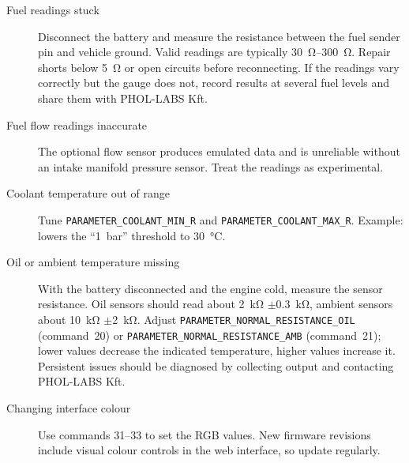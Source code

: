 \begin{description}
    \item[Fuel readings stuck] Disconnect the battery and measure the resistance between the fuel sender pin and vehicle ground. Valid readings are typically \SIrange{30}{300}{\ohm}. Repair shorts below \SI{5}{\ohm} or open circuits before reconnecting. If the readings vary correctly but the gauge does not, record  results at several fuel levels and share them with PHOL-LABS Kft.
    \item[Fuel flow readings inaccurate] The optional flow sensor produces emulated data and is unreliable without an intake manifold pressure sensor. Treat the readings as experimental.
    \item[Coolant temperature out of range] Tune \texttt{PARAMETER\_COOLANT\_MIN\_R} and \texttt{PARAMETER\_COOLANT\_MAX\_R}. Example:  lowers the ``1~bar'' threshold to \SI{30}{\celsius}.
    \item[Oil or ambient temperature missing] With the battery disconnected and the engine cold, measure the sensor resistance. Oil sensors should read about \SI{2}{\kilo\ohm} \ensuremath{\pm}\SI{0.3}{\kilo\ohm}, ambient sensors about \SI{10}{\kilo\ohm} \ensuremath{\pm}\SI{2}{\kilo\ohm}. Adjust \texttt{PARAMETER\_NORMAL\_RESISTANCE\_OIL} (command~20) or \texttt{PARAMETER\_NORMAL\_RESISTANCE\_AMB} (command~21); lower values decrease the indicated temperature, higher values increase it. Persistent issues should be diagnosed by collecting  output and contacting PHOL-LABS Kft.
    \item[Changing interface colour] Use commands 31--33 to set the RGB values. New firmware revisions include visual colour controls in the web interface, so update regularly.
\end{description}
